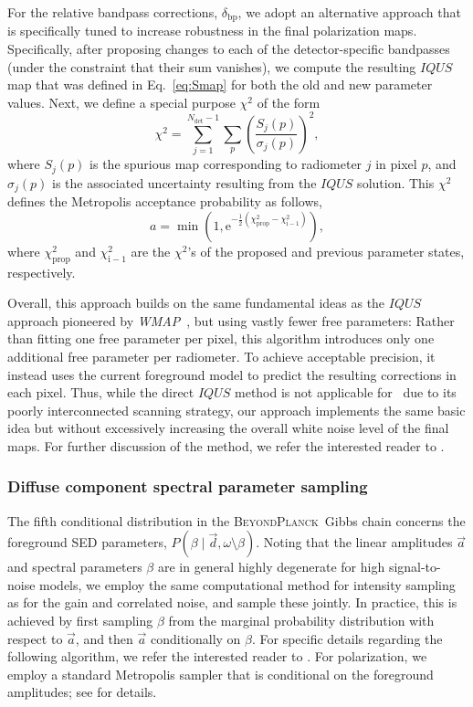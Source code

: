 \documentclass[onecolumn]{aa}
\def\WMAP{\emph{WMAP}}
\renewcommand{\d}[0]{\vec{d}}
\renewcommand{\a}[0]{\vec{a}}
\newcommand{\BP}{\textsc{BeyondPlanck}}
\newcommand{\e}{\mathrm e}
\begin{document}
For the relative bandpass corrections, $\delta_{\mathrm{bp}}$, we
adopt an alternative approach that is specifically tuned to increase
robustness in the final polarization maps. Specifically, after
proposing changes to each of the detector-specific bandpasses (under
the constraint that their sum vanishes), we compute the resulting
$IQUS$ map that was defined in Eq.~\eqref{eq:Smap} for both the old and
new parameter values. Next, we define a special purpose $\chi^2$ of
the form
\begin{equation}
  \chi^2 = \sum_{j=1}^{N_{\mathrm{det}}-1} \sum_p \left(\frac{S_j(p)}{\sigma_{j}(p)}\right)^2,
\end{equation}
where $S_j(p)$ is the spurious map corresponding to radiometer $j$ in
pixel $p$, and $\sigma_j(p)$ is the associated uncertainty resulting
from the $IQUS$ solution. This $\chi^2$ defines the Metropolis
acceptance probability as follows,
\begin{equation}
a = \min\left(1,\e^{-\frac{1}{2}(\chi^2_{\mathrm{prop}}-\chi^2_{\mathrm{i-1}})}\right),
\end{equation}
where $\chi^2_{\mathrm{prop}}$ and $\chi^2_{\mathrm{i-1}}$ are the
$\chi^2$'s of the proposed and previous parameter states, respectively.

Overall, this approach builds on the same fundamental ideas as the
$IQUS$ approach pioneered by \WMAP\ \citep{page2007}, but using vastly
fewer free parameters: Rather than fitting one free parameter per
pixel, this algorithm introduces only one additional free parameter
per radiometer. To achieve acceptable precision, it instead uses the
current foreground model to predict the resulting corrections in each
pixel. Thus, while the direct $IQUS$ method is not applicable for
\Planck\ due to its poorly interconnected scanning strategy, our
approach implements the same basic idea but without excessively
increasing the overall white noise level of the final maps. For
further discussion of the method, we refer the interested reader to
\citet{bp09}.

\subsubsection{Diffuse component spectral parameter sampling}
\label{sec:beta}  

The fifth conditional distribution in the \BP\ Gibbs chain concerns
the foreground SED parameters, $P(\beta\mid \d,
\omega\setminus\beta)$. Noting that the linear amplitudes $\a$ and
spectral parameters $\beta$ are in general highly degenerate for high
signal-to-noise models, we employ the same computational method for
intensity sampling as for the gain and correlated noise, and sample
these jointly. In practice, this is achieved by first sampling $\beta$
from the marginal probability distribution with respect to $\a$, and
then $\a$ conditionally on $\beta$. For specific details regarding the
following algorithm, we refer the interested reader to
\citet{bp13}. For polarization, we employ a standard Metropolis
sampler that is conditional on the foreground amplitudes; see
\citet{bp14} for details. 
\end{document}
